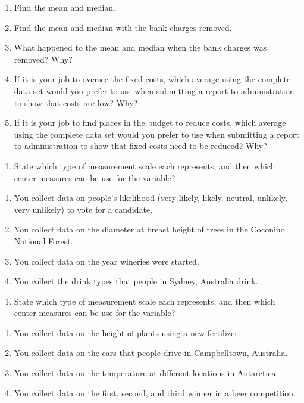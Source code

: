 \documentclass[]{book}
\providecommand{\tightlist}{%
  \setlength{\itemsep}{0pt}\setlength{\parskip}{0pt}}
\begin{document}
\begin{enumerate}
\def\labelenumi{\alph{enumi}.}
\item
  Find the mean and median.
\item
  Find the mean and median with the bank charges removed.
\item
  What happened to the mean and median when the bank charges was
  removed? Why?
\item
  If it is your job to oversee the fixed costs, which average using
  the complete data set would you prefer to use when submitting a
  report to administration to show that costs are low? Why?
\item
  If it is your job to find places in the budget to reduce costs,
  which average using the complete data set would you prefer to use
  when submitting a report to administration to show that fixed costs
  need to be reduced? Why?
\end{enumerate}

\begin{enumerate}
\def\labelenumi{\arabic{enumi}.}
\setcounter{enumi}{6}
\tightlist
\item
  State which type of measurement scale each represents, and then
  which center measures can be use for the variable?
\end{enumerate}

\begin{enumerate}
\def\labelenumi{\alph{enumi}.}
\item
  You collect data on people's likelihood (very likely, likely,
  neutral, unlikely, very unlikely) to vote for a candidate.
\item
  You collect data on the diameter at breast height of trees in the
  Coconino National Forest.
\item
  You collect data on the year wineries were started.
\item
  You collect the drink types that people in Sydney, Australia drink.
\end{enumerate}

\begin{enumerate}
\def\labelenumi{\arabic{enumi}.}
\setcounter{enumi}{7}
\tightlist
\item
  State which type of measurement scale each represents, and then
  which center measures can be use for the variable?
\end{enumerate}

\begin{enumerate}
\def\labelenumi{\alph{enumi}.}
\item
  You collect data on the height of plants using a new fertilizer.
\item
  You collect data on the cars that people drive in Campbelltown,
  Australia.
\item
  You collect data on the temperature at different locations in
  Antarctica.
\item
  You collect data on the first, second, and third winner in a beer
  competition.
\end{enumerate}
\end{document}
